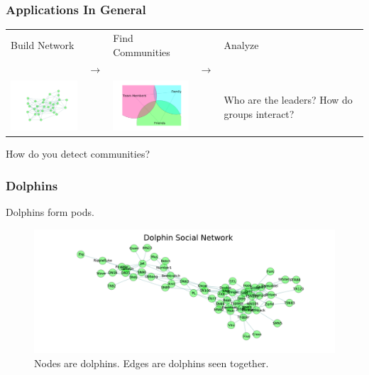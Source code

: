 \documentclass{beamer}
\begin{document}
\begin{frame}\frametitle{Applications In General}

\begin{table}[ht]
\centering
\begin{tabular}{p{.9in} p{.1in} p{1.3in} p{.1in} p{2in}}
Build Network &  & Find Communities &  & Analyze \\
& $\rightarrow$ & & $\rightarrow$ & \\
\includegraphics[width=1.3in]{Figures/random_graph} &  & \includegraphics[width=1.3in]{Figures/abstract_community} &  & Who are the leaders? \newline How do groups interact? \newline 
\end{tabular}
\end{table}


\begin{block}{}
\begin{center}
How do you detect communities?
\end{center}
\end{block}

\end{frame}


\begin{frame}\frametitle{Dolphins}
Dolphins form pods.
\begin{figure}
\includegraphics[width=5in]{Figures/dolphin_social_network}
\caption{Nodes are dolphins.  Edges are dolphins seen together.}
\end{figure}
\end{frame}
\end{document}

